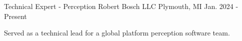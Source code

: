 

\begin{cventries}

  \cventry
    {Technical Expert - Perception} %
    {Robert Bosch LLC} %
    {Plymouth, MI} %
    {Jan. 2024 - Present} %
    {
      \begin{cvitems} %
        \item {Served as a technical lead for a global platform perception software team.}
      \end{cvitems}
    }


\end{cventries}
